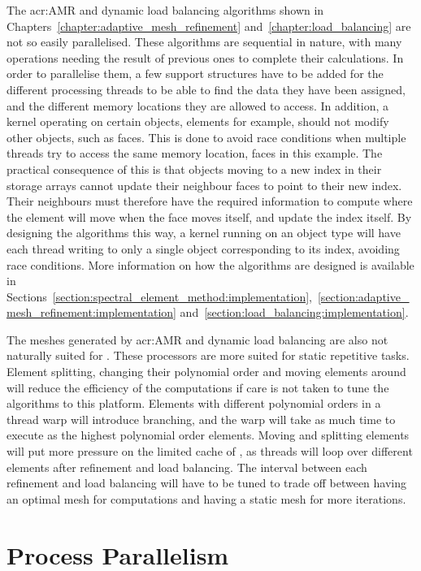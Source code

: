 The \acrlong{acr:AMR} and dynamic load balancing algorithms shown in
Chapters~\ref{chapter:adaptive_mesh_refinement} and~\ref{chapter:load_balancing} are not so easily
parallelised. These algorithms are sequential in nature, with many operations needing the result of
previous ones to complete their calculations. In order to parallelise them, a few support structures
have to be added for the different processing threads to be able to find the data they have been
assigned, and the different memory locations they are allowed to access. In addition, a kernel
operating on certain objects, elements for example, should not modify other objects, such as faces.
This is done to avoid race conditions when multiple threads try to access the same memory location,
faces in this example. The practical consequence of this is that objects moving to a new index in
their storage arrays cannot update their neighbour faces to point to their new index. Their
neighbours must therefore have the required information to compute where the element will move when
the face moves itself, and update the index itself. By designing the algorithms this way, a kernel
running on an object type will have each thread writing to only a single object corresponding to its
index, avoiding race conditions. More information on how the algorithms are designed is available in
Sections~\ref{section:spectral_element_method:implementation},~\ref{section:adaptive_mesh_refinement:implementation}
and~\ref{section:load_balancing:implementation}.

The meshes generated by \acrlong{acr:AMR} and dynamic load balancing are also not naturally suited
for . These processors are more suited for static repetitive tasks. Element
splitting, changing their polynomial order and moving elements around will reduce the efficiency of
the computations if care is not taken to tune the algorithms to this platform. Elements with
different polynomial orders in a thread warp will introduce branching, and the warp will take as
much time to execute as the highest polynomial order elements. Moving and splitting elements will
put more pressure on the limited cache of , as threads will loop over different
elements after refinement and load balancing. The interval between each refinement and load
balancing will have to be tuned to trade off between having an optimal mesh for computations and
having a static mesh for more iterations.

\section{Process Parallelism}\label{section:graphics_processing_units:process_parallelism}


